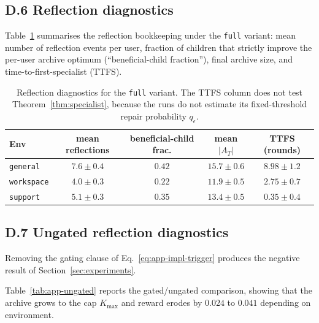 \documentclass{article} %
\begin{document}
\subsection{D.6 Reflection diagnostics}

\label{app:tab-refl}

Table~\ref{tab:app-reflection} summarises the reflection bookkeeping under the \texttt{full} variant: mean number of reflection events per user, fraction of children that strictly improve the per-user archive optimum (``beneficial-child fraction''), final archive size, and time-to-first-specialist (TTFS).

\begin{table}[h]
\centering
\small
\begin{tabular}{lcccc}
\toprule
Env & mean reflections & beneficial-child frac. & mean $|A_T|$ & TTFS (rounds) \\
\midrule
\texttt{general}   & $7.6 \pm 0.4$ & $0.42$ & $15.7 \pm 0.6$ & $8.98 \pm 1.2$ \\
\texttt{workspace} & $4.0 \pm 0.3$ & $0.22$ & $11.9 \pm 0.5$ & $2.75 \pm 0.7$ \\
\texttt{support}   & $5.1 \pm 0.3$ & $0.35$ & $13.4 \pm 0.5$ & $0.35 \pm 0.4$ \\
\bottomrule
\end{tabular}
\caption{Reflection diagnostics for the \texttt{full} variant. The TTFS column
does not test Theorem~\ref{thm:specialist}, because the runs do not estimate its
fixed-threshold repair probability \(q_\epsilon\).}
\label{tab:app-reflection}
\end{table}

\subsection{D.7 Ungated reflection diagnostics}

\label{app:tab-ungated}

Removing the gating clause of Eq.~\eqref{eq:app-impl-trigger} produces the
negative result of Section~\ref{sec:experiments}.

Table~\ref{tab:app-ungated} reports the gated/ungated comparison, showing that the archive grows to the cap $K_{\max}$ and reward erodes by $0.024$ to $0.041$ depending on environment.
\end{document}
